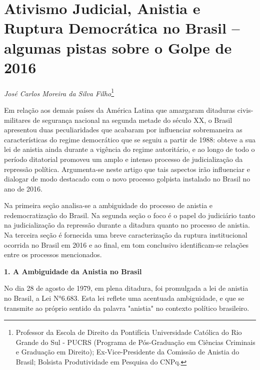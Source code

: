 \chapter{Ativismo Judicial, Anistia e Ruptura Democrática no Brasil --
algumas pistas sobre o Golpe de 2016}

\begin{flushright}
\emph{José Carlos Moreira da Silva Filho}\footnote{Professor da Escola
  de Direito da Pontifícia Universidade Católica do Rio Grande do Sul -
  PUCRS (Programa de Pós-Graduação em Ciências Criminais e Graduação em
  Direito); Ex-Vice-Presidente da Comissão de Anistia do Brasil;
  Bolsista Produtividade em Pesquisa do CNPq.}
\end{flushright}

Em relação aos demais países da América Latina que amargaram ditaduras
civis-militares de segurança nacional na segunda metade do século XX, o
Brasil apresentou duas peculiaridades que acabaram por influenciar
sobremaneira as características do regime democrático que se seguiu a
partir de 1988: obteve a sua lei de anistia ainda durante a vigência do
regime autoritário, e ao longo de todo o período ditatorial promoveu um
amplo e intenso processo de judicialização da repressão política.
Argumenta-se neste artigo que tais aspectos irão influenciar e dialogar
de modo destacado com o novo processo golpista instalado no Brasil no
ano de 2016.

Na primeira seção analisa-se a ambiguidade do processo de anistia e
redemocratização do Brasil. Na segunda seção o foco é o papel do
judiciário tanto na judicialização da repressão durante a ditadura
quanto no processo de anistia. Na terceira seção é fornecida uma breve
caracterização da ruptura institucional ocorrida no Brasil em 2016 e ao
final, em tom conclusivo identificam-se relações entre os processos
mencionados.

\textbf{1. A Ambiguidade da Anistia no Brasil}

No dia 28 de agosto de 1979, em plena ditadura, foi promulgada a lei de
anistia no Brasil, a Lei N°6.683. Esta lei reflete uma acentuada
ambiguidade, e que se transmite ao próprio sentido da palavra "anistia"
no contexto político brasileiro.

